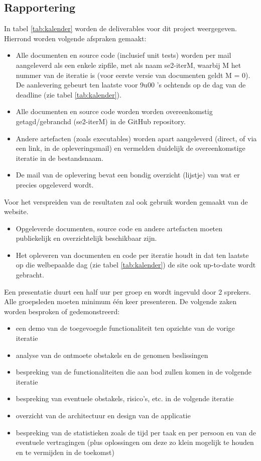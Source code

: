 \subsection{Rapportering} \label{sec:rapportering}
In tabel \ref{tab:kalender} worden de deliverables voor dit project weergegeven. Hierrond worden volgende afspraken gemaakt:
\begin{itemize}
\item Alle documenten en source code (inclusief unit tests) worden per mail aangeleverd als een enkele zipfile, met als naam se2-iterM, waarbij M het nummer van de iteratie is (voor eerste versie van documenten geldt M = 0). De aanlevering gebeurt ten laatste voor 9u00 ’s ochtends op de dag van de deadline (zie tabel \ref{tab:kalender}).
\item Alle documenten en source code worden worden overeenkomstig getagd/gebranchd (se2-iterM) in de GitHub repository.
\item Andere artefacten (zoals executables) worden apart aangeleverd (direct, of via een link, in de opleveringsmail) en vermelden duidelijk de overeenkomstige iteratie in de bestandsnaam.
\item De mail van de oplevering bevat een bondig overzicht (lijstje) van wat er precies opgeleverd
wordt.
\end{itemize}
Voor het verspreiden van de resultaten zal ook gebruik worden gemaakt van de website. 
\begin{itemize}
\item Opgeleverde documenten, source code en andere artefacten moeten publiekelijk en overzichtelijk beschikbaar zijn.
\item Het opleveren van documenten en code per iteratie houdt in dat ten laatste op die welbepaalde dag (zie tabel \ref{tab:kalender}) de site ook up-to-date wordt gebracht.
\end{itemize}
Een presentatie duurt een half uur per groep en wordt ingevuld door 2 sprekers. Alle groepsleden moeten minimum \'{e}\'{e}n keer presenteren. De volgende zaken worden besproken of gedemonstreerd:
\begin{itemize}
\item een demo van de toegevoegde functionaliteit ten opzichte van de vorige iteratie
\item analyse van de ontmoete obstakels en de genomen beslissingen
\item bespreking van de functionaliteiten die aan bod zullen komen in de volgende iteratie
\item bespreking van eventuele obstakels, risico’s, etc. in de volgende iteratie
\item overzicht van de architectuur en design van de applicatie
\item bespreking van de statistieken zoals de tijd per taak en per persoon en van de eventuele vertragingen (plus oplossingen om deze zo klein mogelijk te houden en te vermijden in de toekomst)
\end{itemize}

